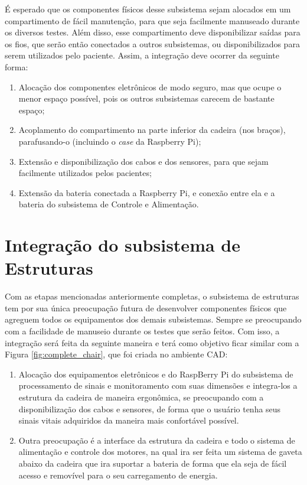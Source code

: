 É esperado que os componentes físicos desse subsistema sejam alocados em um
compartimento de fácil manutenção, para que seja facilmente manuseado durante
os diversos testes. Além disso, esse compartimento deve disponibilizar saídas
para os fios, que serão então conectados a outros subsistemas, ou
disponibilizados para serem utilizados pelo paciente. Assim, a integração deve
ocorrer da seguinte forma:

\begin{enumerate}
    \item Alocação dos componentes eletrônicos de modo seguro, mas que ocupe
        o menor espaço possível, pois os outros subsistemas carecem de bastante
        espaço;
    \item Acoplamento do compartimento na parte inferior da cadeira (nos braços),
        parafusando-o (incluindo o \textit{case} da Raspberry Pi);
    \item Extensão e disponibilização dos cabos e dos sensores, para que sejam
        facilmente utilizados pelos pacientes;
    \item Extensão da bateria conectada a Raspberry Pi, e conexão entre ela e a
        bateria do subsistema de Controle e Alimentação.
\end{enumerate}

\section{Integração do subsistema de Estruturas}

Com as etapas mencionadas anteriormente completas, o subsistema de estruturas
tem por sua única preocupação futura de desenvolver componentes físicos que
agreguem todos os equipamentos dos demais subsistemas. Sempre se preocupando
com a facilidade de manuseio durante os testes que serão feitos. Com isso, a
integração será feita da seguinte maneira e terá como objetivo ficar similar
com a Figura \ref{fig:complete_chair}, que foi criada no ambiente CAD:

\begin{enumerate}
    \item Alocação dos equipamentos eletrônicos e do RaspBerry Pi do subsistema
    de processamento de sinais e monitoramento com suas dimensões e integra-los
    a estrutura da cadeira de maneira ergonômica, se preocupando com a
    disponibilização dos cabos e sensores, de forma que o usuário tenha seus
    sinais vitais adquiridos da maneira mais confortável possível.
    \item Outra preocupação é a interface da estrutura da cadeira e todo o
    sistema de alimentação e controle dos motores, na qual ira ser feita um
    sistema de gaveta abaixo da cadeira que ira suportar a bateria de forma
    que ela seja de fácil acesso e removível para o seu carregamento de energia.
\end{enumerate}

